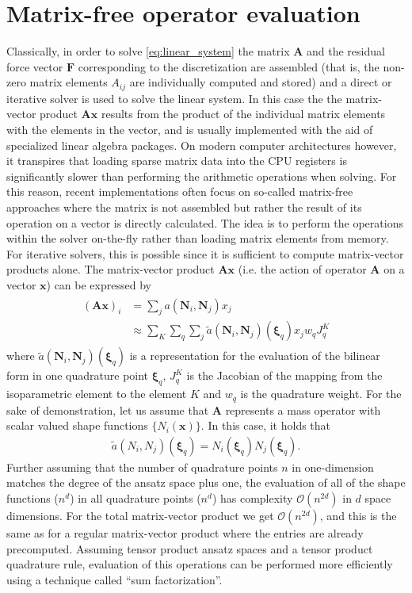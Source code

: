 \documentclass[times,doublespace]{nmeauth}
\def\gz  #1{           \mbox{$\boldsymbol{#1}$}}
\begin{document}
\section{Matrix-free operator evaluation}
\label{sec:mf}
Classically, in order to solve \eqref{eq:linear_system} the matrix $\gz A$ and the residual force vector $\gz F$ corresponding to the discretization are assembled (that is, the non-zero matrix elements $A_{ij}$ are individually computed and stored) and a direct or iterative solver is used to solve the linear system.
In this case the the matrix-vector product $\gz A \gz x$ results from the product of the individual matrix elements with the elements in the vector, and is usually implemented with the aid of specialized linear algebra packages.
On modern computer architectures however, it transpires that loading sparse matrix data into the CPU registers is significantly slower than performing the arithmetic operations when solving.
For this reason, recent implementations often focus on so-called matrix-free approaches where the matrix is not assembled but rather the result of its operation on a vector is directly calculated.
The idea is to perform the operations within the solver on-the-fly rather than loading matrix elements from memory.
For iterative solvers, this is possible since it is sufficient to compute matrix-vector products alone.
%
The matrix-vector product $\gz A \gz x$ (i.e. the action of operator $\gz A$ on a vector $\gz x$) can be expressed by
\begin{align}
  \begin{split}
 (\gz A \gz x)_i &= \sum_j a(\gz N_i,\gz N_j) x_j \\
        &\approx \sum_K \sum_q \sum_j \tilde{a}(\gz N_i,\gz N_j)(\gz \xi_q) x_j w_q J^K_q
  \end{split}
  \label{eq:mf_vmult}
\end{align}
where $\tilde{a}(\gz N_i,\gz N_j)(\gz \xi_q)$ is a representation for the evaluation of the bilinear form in one quadrature point $\gz \xi_q$, $J^K_q$ is the Jacobian of the mapping from the isoparametric element to the element $K$ and
$w_q$ is the quadrature weight.
For the sake of demonstration, let us assume that $\gz A$ represents a mass operator with scalar valued shape functions $\{ N_i(\gz x) \}$. In this case, it holds that
\begin{align*}
 \tilde{a}(N_i,N_j)(\gz \xi_q) = N_i(\gz \xi_q)N_j(\gz \xi_q).
\end{align*}
Further assuming that the number of quadrature points $n$ in one-dimension matches the degree of the ansatz space plus one, the evaluation of all of the shape functions ($n^d$)
in all quadrature points ($n^d$) has complexity $\mathcal{O}(n^{2d})$ in $d$ space dimensions.
For the total matrix-vector product we get $\mathcal{O}(n^{2d})$,
and this is the same as for a regular matrix-vector product where the entries are already precomputed. Assuming tensor product ansatz spaces and a tensor product quadrature rule, evaluation of this operations can be performed more efficiently using a technique called ``sum factorization''.
\end{document}
